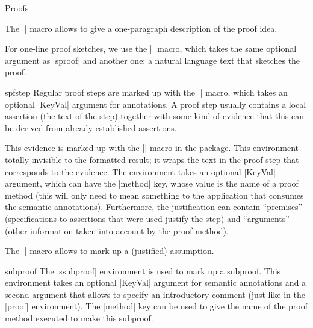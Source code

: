 \begin{sfragment}{Proofs}
\begin{function}{\spfidea}
  The |\spfidea| macro allows to give a one-paragraph description of the proof idea.
\end{function}

\begin{function}{\spfsketch}
  For one-line proof sketches, we use the |\spfsketch| macro, which takes the same
  optional argument as |sproof| and another one: a natural language text that sketches
  the proof.
\end{function}

\begin{function}{spfstep}
  Regular proof steps are marked up with the |\spfstep| macro, which takes an optional
  |KeyVal| argument for annotations. A proof step usually contains a local assertion
  (the text of the step) together with some kind of evidence that this can be derived
  from already established assertions.
\end{function}

\begin{function}{\spfjust}
  This evidence is marked up with the |\spfjust| macro in the 
  package. This environment totally invisible to the formatted result; it wraps the text
  in the proof step that corresponds to the evidence. The environment takes an optional
  |KeyVal| argument, which can have the |method| key, whose value is the name of a proof
  method (this will only need to mean something to the application that consumes the
  semantic annotations). Furthermore, the justification can contain ``premises''
  (specifications to assertions that were used justify the step) and ``arguments''
  (other information taken into account by the proof method).
\end{function}

\begin{function}{\assumption}
  The |\assumption| macro allows to mark up a (justified) assumption.
\end{function}

\begin{function}{\justarg}
\end{function}

\begin{environment}{subproof}
  The |ssubproof| environment is used to mark up a subproof. This environment takes an
  optional |KeyVal| argument for semantic annotations and a second argument that allows
  to specify an introductory comment (just like in the |proof| environment). The
  |method| key can be used to give the name of the proof method
  executed to make this subproof.
\end{environment}


\end{sfragment}
